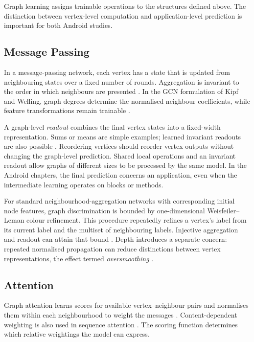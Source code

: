 Graph learning assigns trainable operations to the structures defined above. The distinction
between vertex-level computation and application-level prediction is important for both
Android studies.

\subsection{Message Passing}
\label{sec:background:learning:messagepassing}

In a message-passing network, each vertex has a state that is updated from neighbouring
states over a fixed number of rounds. Aggregation is invariant to the order in which
neighbours are presented \cite{gilmer2017neural}. In the GCN formulation of Kipf and Welling,
graph degrees determine the normalised neighbour coefficients, while feature transformations
remain trainable \cite{kipf2017semi}.

A graph-level \emph{readout} combines the final vertex states into a fixed-width representation.
Sums or means are simple examples; learned invariant readouts are also possible
\cite{gilmer2017neural,xu2019powerful}. Reordering vertices should reorder vertex outputs
without changing the graph-level prediction. Shared local operations and an invariant
readout allow graphs of different sizes to be processed by the same model. In the Android
chapters, the final prediction concerns an application, even when the intermediate learning
operates on blocks or methods.

For standard neighbourhood-aggregation networks with corresponding initial node features,
graph discrimination is bounded by one-dimensional Weisfeiler--Leman colour refinement.
This procedure repeatedly refines a vertex's label from its current label and the multiset
of neighbouring labels. Injective aggregation and readout can attain that bound
\cite{xu2019powerful}. Depth introduces a separate concern: repeated normalised propagation
can reduce distinctions between vertex representations, the effect termed
\emph{oversmoothing} \cite{li2018deeper}.

\subsection{Attention}
\label{sec:background:learning:attention}

Graph attention learns scores for available vertex--neighbour pairs and normalises them
within each neighbourhood to weight the messages \cite{velickovic2018graph}.
Content-dependent weighting is also used in sequence attention \cite{vaswani2017attention}.
The scoring function determines which relative weightings the model can express.

